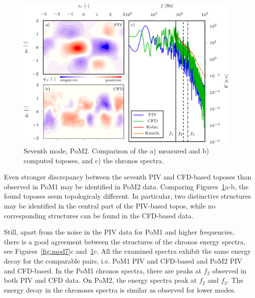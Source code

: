 {\begin{figure}[htbp]
    \centering
    \includegraphics[width=0.98\textwidth]{02_images/00_export/figure18.png}
    \caption{{Seventh mode, PoM2.} Comparison of the a) measured and b) computed toposes, and c) the chronos spectra.}
    \label{fig:pom2mod7}
\end{figure}
{{Even stronger} discrepancy between the seventh PIV and CFD-based toposes {than} observed in PoM1 may be identified in PoM2 data. Comparing Figures~\ref{fig:pom2mod7}a-b, the found toposes seem topologicaly different. In particular, two distinctive structures may be identified in the central part of the PIV-based topos, while no corresponding structures can be found in the CFD-based data.}

{Still, apart from the noise in the PIV data for PoM1 and higher frequencies, there is a good agreement between the structures of the chronos energy spectra, see Figures~\ref{fig:mod7}c and~\ref{fig:pom2mod7}c. All the examined spectra exhibit the same energy decay for the comparable pairs, i.e. PoM1 PIV and CFD-based and PoM2 PIV and CFD-based. In the PoM1 chronos spectra, there are peaks at $f_{2}$ observed in both PIV and CFD data. On PoM2, the energy spectra peak at $f_{2}$ and $f_{3}$. The energy decay in the chronoses spectra is similar as observed for lower modes.}

}
